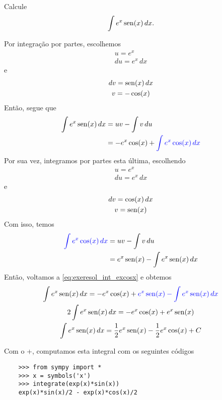 \begin{exeresol}
  Calcule
  \begin{equation}
    \int e^x\operatorname{sen}(x)\,dx.
  \end{equation}
\end{exeresol}
\begin{resol}
  Por integração por partes, escolhemos
  \begin{gather}
    u = e^x\\
    du = e^x\,dx
  \end{gather}
  e
  \begin{gather}
    dv = \operatorname{sen}(x)\,dx\\
    v = -\cos(x)
  \end{gather}
  Então, segue que
  \begin{align}\label{eq:exeresol_int_excosx}
    \int e^x\operatorname{sen}(x)\,dx &= uv - \int v\,du\\
                        &= -e^x\cos(x) + {\color{blue}\int e^x\cos(x)\,dx}
  \end{align}
  Por sua vez, integramos por partes esta última, escolhendo
  \begin{gather}
    u = e^x\\
    du = e^x\,dx
  \end{gather}
  e
  \begin{gather}
    dv = \cos(x)\,dx\\
    v = \operatorname{sen}(x)
  \end{gather}
  Com isso, temos
  \begin{align}
    {\color{blue}\int e^x\cos(x)\,dx} &= uv - \int v\,du\\
                                      &= e^x\operatorname{sen}(x) - \int e^x\operatorname{sen}(x)\,dx
  \end{align}
  Então, voltamos a \eqref{eq:exeresol_int_excosx} e obtemos
  \begin{gather}
    \int e^x\operatorname{sen}(x)\,dx = -e^x\cos(x) + {\color{blue}e^x\operatorname{sen}(x) - \int e^x\operatorname{sen}(x)\,dx}\\
    2\int e^x\operatorname{sen}(x)\,dx = -e^x\cos(x) + e^x\operatorname{sen}(x)\\
    \int e^x\operatorname{sen}(x)\,dx = \frac{1}{2}e^x\operatorname{sen}(x) - \frac{1}{2}e^x\cos(x) + C
  \end{gather}

  \ifispython
  Com o {\python}+{\sympy}, computamos esta integral com os seguintes códigos
  \begin{lstlisting}
    >>> from sympy import *
    >>> x = symbols('x')
    >>> integrate(exp(x)*sin(x))
    exp(x)*sin(x)/2 - exp(x)*cos(x)/2
  \end{lstlisting}
  \fi
\end{resol}

